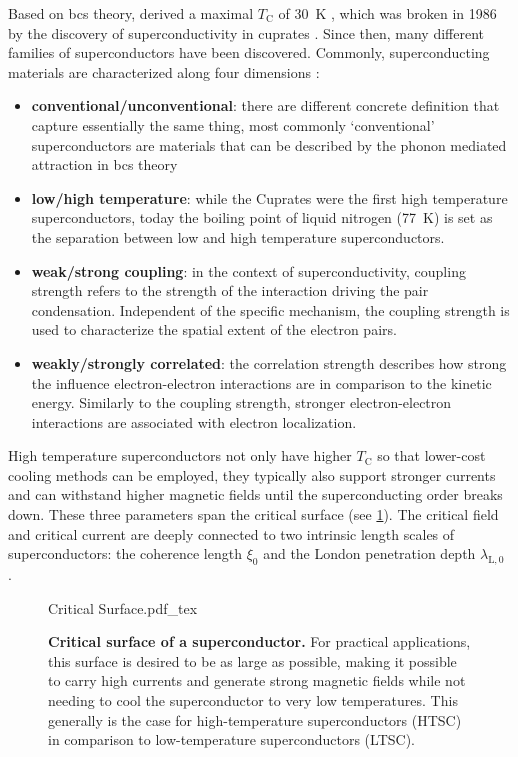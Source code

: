 \documentclass[../main.tex]{subfiles}
\begin{document}
Based on \gls{bcs} theory, \citeauthor{cohenCommentsMaximumSuperconducting1972} derived a maximal \(T_{\mathrm{C}}\) of \qty{30}{\kelvin} \cite{cohenCommentsMaximumSuperconducting1972}, which was broken in 1986 by the discovery of superconductivity in cuprates \cite{bednorzPossibleHighTc1986,uchidaHighTcSuperconductivity1987}.
Since then, many different families of superconductors have been discovered.
Commonly, superconducting materials are characterized along four dimensions \cite{wittElectronCorrelationsUnconventional}:
\begin{itemize}
	\item \textbf{conventional/unconventional}: there are different concrete definition that capture essentially the same thing, most commonly `conventional' superconductors are materials that can be described by the phonon mediated attraction in \gls{bcs} theory
	\item \textbf{low/high temperature}: while the Cuprates were the first high temperature superconductors, today the boiling point of liquid nitrogen (\qty{77}{\kelvin}) is set as the separation between low and high temperature superconductors.
	\item \textbf{weak/strong coupling}: in the context of superconductivity, coupling strength refers to the strength of the interaction driving the pair condensation. Independent of the specific mechanism, the coupling strength is used to characterize the spatial extent of the electron pairs.
	\item \textbf{weakly/strongly correlated}: the correlation strength describes how strong the influence electron-electron interactions are in comparison to the kinetic energy. Similarly to the coupling strength, stronger electron-electron interactions are associated with electron localization.
\end{itemize}
High temperature superconductors not only have higher \(T_{\mathrm{C}}\) so that lower-cost cooling methods can be employed, they typically also support stronger currents and can withstand higher magnetic fields until the superconducting order breaks down.
These three parameters span the critical surface (see \cref{fig:Critical Surface of a SC}).
The critical field and critical current are deeply connected to two intrinsic length scales of superconductors: the coherence length \(\xi_0\) and the London penetration depth \(\lambda_{\mathrm{L}, 0}\) \cite{tinkhamIntroductionSuperconductivity1996}.

\begin{figure}
	\centering
	{Critical Surface.pdf_tex}
	\caption[Critical surface of a superconductor.]{\textbf{Critical surface of a superconductor.} For practical applications, this surface is desired to be as large as possible, making it possible to carry high currents and generate strong magnetic fields while not needing to cool the superconductor to very low temperatures. This generally is the case for high-temperature superconductors (HTSC) in comparison to low-temperature superconductors (LTSC).}
	\label{fig:Critical Surface of a SC}
\end{figure}
\end{document}
